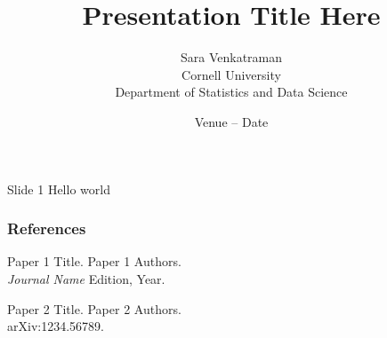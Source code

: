 \documentclass[handout]{beamer}
\title{Presentation Title Here}
\author{Sara Venkatraman \\[0.5em] \footnotesize Cornell University \\ Department of Statistics and Data Science}
\date{Venue -- Date}
\begin{document}
\begin{frame}
  \titlepage
\end{frame}

\begin{frame}{Slide 1}
  Hello world
\end{frame}

\begin{frame}%
  \frametitle<presentation>{References}

  \begin{thebibliography}{10}

    \beamertemplatearticlebibitems
    {\footnotesize {}
      Paper 1 Title.
      \newblock Paper 1 Authors. \\
      {\em Journal Name} Edition, Year.

      Paper 2 Title.
      \newblock Paper 2 Authors.\\
      arXiv:1234.56789.
    }
  \end{thebibliography}
\end{frame}
\end{document}
